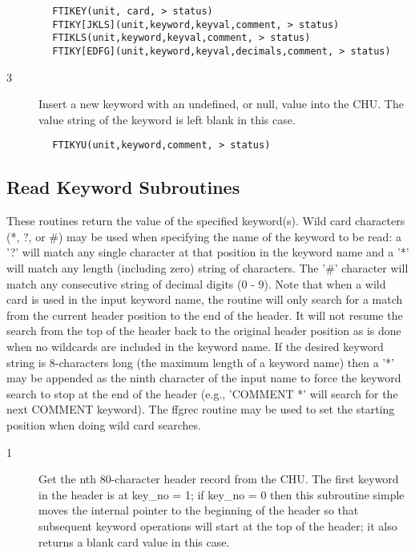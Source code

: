 \documentclass[11pt]{book}
\begin{document}
\begin{verbatim}
        FTIKEY(unit, card, > status)
        FTIKY[JKLS](unit,keyword,keyval,comment, > status)
        FTIKLS(unit,keyword,keyval,comment, > status)
        FTIKY[EDFG](unit,keyword,keyval,decimals,comment, > status)
\end{verbatim}

\begin{description}
\item[3 ] Insert a new keyword with an undefined, or null, value into the CHU.
   The value string of the keyword is left blank in this case.
\end{description}

\begin{verbatim}
        FTIKYU(unit,keyword,comment, > status)
\end{verbatim}

\subsection{Read Keyword Subroutines \label{FTGREC}}

These routines return the value of the specified keyword(s).  Wild card
characters (*, ?, or \#) may be used when specifying the name of the keyword
to be read: a '?' will match any single character at that position in the
keyword name and a '*' will match any length (including zero) string of
characters.  The '\#' character will match any consecutive string of
decimal digits (0 - 9). Note that when a wild card is used in the input
keyword name, the routine will only search for a match from the current
header position to the end of the header.  It will not resume the search
from the top of the header back to the original header position as is done
when no wildcards are included in the keyword name.  If the desired
keyword string is 8-characters long (the maximum length of a keyword
name) then a '*' may be appended as the ninth character of the input
name to force the keyword search to stop at the end of the header
(e.g., 'COMMENT *' will search for the next COMMENT keyword).  The
ffgrec routine may be used to set the starting position when doing
wild card searches.


\begin{description}
\item[1 ]Get the nth 80-character header record from the CHU.  The first keyword
   in the header is at key\_no = 1;  if key\_no = 0 then this subroutine
   simple moves the internal pointer to the beginning of the header
   so that subsequent keyword operations will start at the top of
  the header; it also returns a blank card value in this case.
\end{description}
\end{document}
